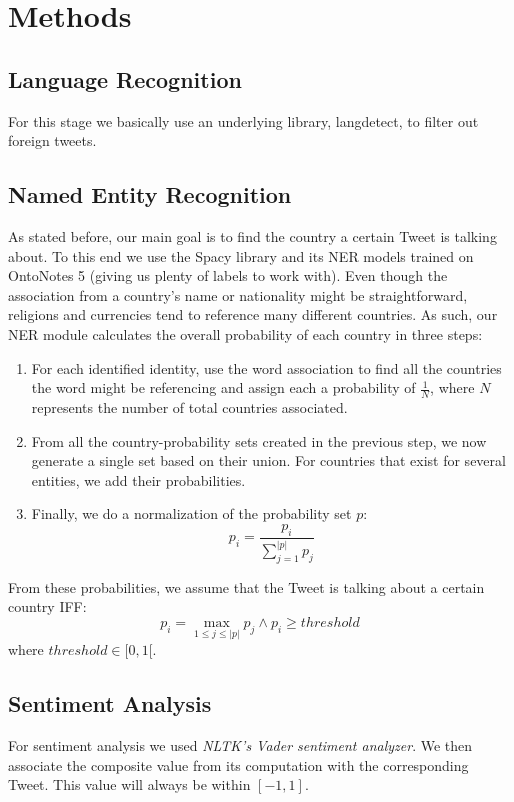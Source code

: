 \documentclass[11pt]{article}
\begin{document}
	\section{Methods}
	\subsection{Language Recognition}
	\label{sub:language_recognition}
	For this stage we basically use an underlying library, langdetect, to filter out foreign tweets.
	
	\subsection{Named Entity Recognition}
	\label{sub:named_entity_recognition}
	As stated before, our main goal is to find the country a certain Tweet is talking about. To this end we use the Spacy library and its NER models trained on OntoNotes 5 (giving us plenty of labels to work with). Even though the association from a country's name or nationality might be straightforward, religions and currencies tend to reference many different countries. As such, our NER module calculates the overall probability of each country in three steps:
	\begin{enumerate}
		\item For each identified identity, use the word association to find all the countries the word might be referencing and assign each a probability of $\frac{1}{N}$, where $N$ represents the number of total countries associated.
		\item From all the country-probability sets created in the previous step, we now generate a single set based on their union. For countries that exist for several entities, we add their probabilities.
		\item Finally, we do a normalization of the probability set $p$:
		\begin{equation}
		p_i = \frac{p_{i}}{\sum_{j=1}^{|p|} p_j}
		\end{equation}
	\end{enumerate}
	
	From these probabilities, we assume that the Tweet is talking about a certain country IFF:
	\begin{equation}
	p_{i} = \max_{1 \leq j \leq |p|} p_{j} \wedge p_{i} \ge threshold
	\end{equation}
	where $threshold \in [0, 1[$.
	
	\subsection{Sentiment Analysis}
	\label{sub:sentiment_analysis}
	For sentiment analysis we used \textit{NLTK's Vader sentiment analyzer}. We then associate the composite value from its computation with the corresponding Tweet. This value will always be within $[-1, 1]$.
	
\end{document}

